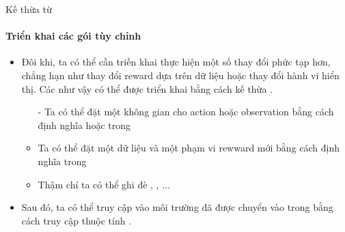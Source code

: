 \documentclass[10pt,aspectratio=169]{beamer}
\begin{document}
\begin{frame}[fragile]{Kế thừa từ }
\framesubtitle{Triển khai các gói tùy chỉnh}
\begin{itemize}
\setlength\itemsep{8pt}
\item Đôi khi, ta có thể cần triền khai  thực hiện một số thay đổi phức tạp hơn, chẳng hạn như thay đổi reward dựa trên dữ liệu hoặc thay đổi hành vi hiển thị. Các  như vậy có thể được triển khai bằng cách kế thừa .
\vspace{4pt}
\begin{itemize}
\setlength\itemsep{4pt}
\item[-] Ta có thể đặt một không gian cho action hoặc observation bằng cách định nghĩa  hoặc  trong 
\item[-] Ta có thể đặt một dữ liệu và một phạm vi rewward mới bằng cách định nghĩa    trong 
\item[-] Thậm chí ta có thể ghi đè , , ...
\end{itemize}
\item Sau đó, ta có thể truy cập vào môi trường đã được chuyển vào trong  bằng cách truy cập thuộc tính .
\end{itemize}
\end{frame}
\end{document}
